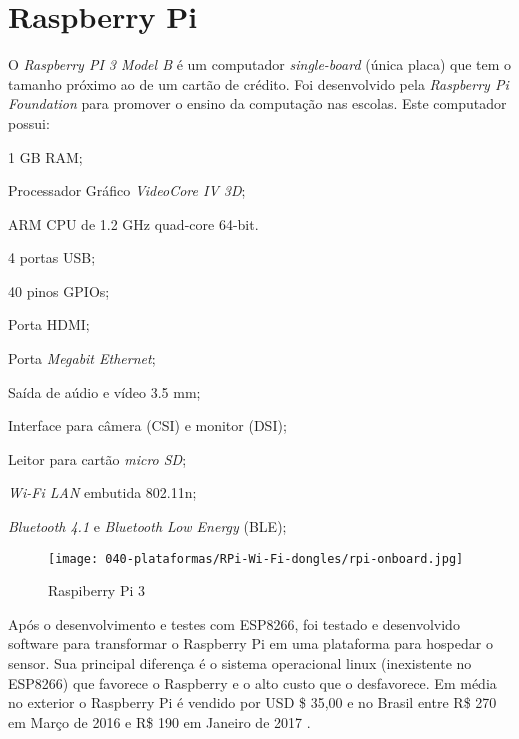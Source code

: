
\section{Raspberry Pi}
\label{sec:Raspberry-Pi}

O \emph{Raspberry PI 3 Model B} é um computador \emph{single-board}  (única
placa) que tem o tamanho próximo ao de um cartão de crédito. Foi desenvolvido
pela \emph{Raspberry Pi Foundation} para promover o ensino da computação nas escolas.
Este computador possui:


\begin{alineas}
	\item 1 GB RAM;

	\item Processador Gráfico \emph{VideoCore IV 3D};

	\item ARM CPU de 1.2 GHz quad-core 64-bit.

	\item 4 portas USB;

	\item 40 pinos GPIOs;

	\item Porta HDMI;

	\item Porta \emph{Megabit Ethernet};

	\item Saída de aúdio e vídeo 3.5 mm;

	\item Interface para câmera (CSI) e monitor (DSI);

	\item Leitor para cartão \emph{micro SD};

	\item \emph{Wi-Fi LAN} embutida 802.11n;

	\item \emph{Bluetooth 4.1} e \emph{Bluetooth Low Energy} (BLE);

\end{alineas}

\begin{figure}[htb]
	\caption{\label{fig:rpi-3}Raspiberry Pi 3 }
	\begin{center}
		\texttt{[image: 040-plataformas/RPi-Wi-Fi-dongles/rpi-onboard.jpg]}
	\end{center}
\end{figure}

Após o desenvolvimento e testes com ESP8266, foi testado e desenvolvido
software para transformar o Raspberry Pi em uma plataforma para hospedar o
sensor. Sua principal diferença é o sistema operacional linux (inexistente no
ESP8266) que favorece o Raspberry e o alto custo que o desfavorece. Em média no
exterior o Raspberry Pi é vendido por USD \$ 35,00 \cite{RPI2016}
e no Brasil entre R\$ 270 em Março de 2016 e R\$ 190 em Janeiro de 2017 \cite{rpi3-mercadolivre}.

